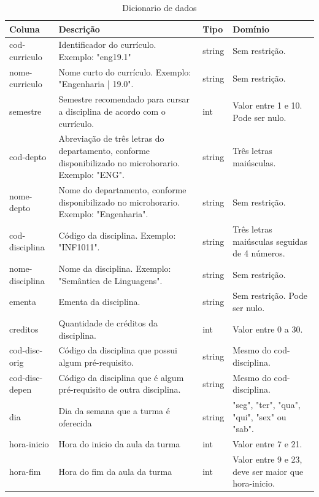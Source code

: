 \begin{longtable}{ | >{\raggedright}m{} | >{\raggedright}m{} | >{\raggedright}m{} | >{\raggedright}m{} | }
    \hline\endhead
    \hline\caption{Dicionario de dados}\endlastfoot

    \textbf{Coluna} & \textbf{Descrição} & \textbf{Tipo} & \textbf{Domínio}\tabularnewline\hline
     
    cod-curriculo & Identificador do currículo. Exemplo: "eng19.1" & string & Sem restrição.\tabularnewline\hline
    nome-curriculo & Nome curto do currículo. Exemplo: "Engenharia | 19.0". & string & Sem restrição.\tabularnewline\hline
    semestre & Semestre recomendado para cursar a disciplina de acordo com o currículo. & int & Valor entre 1 e 10. Pode ser nulo.\tabularnewline\hline

    cod-depto & Abreviação de três letras do departamento, conforme disponibilizado no microhorario. Exemplo: "ENG". & string & Três letras maiúsculas.\tabularnewline\hline
    nome-depto & Nome do departamento, conforme disponibilizado no microhorario. Exemplo: "Engenharia". & string & Sem restrição.\tabularnewline\hline

    cod-disciplina & Código da disciplina. Exemplo: "INF1011". & string & Três letras maiúsculas seguidas de 4 números.\tabularnewline\hline
    nome-disciplina & Nome da disciplina. Exemplo: "Semântica de Linguagens". & string & Sem restrição.\tabularnewline\hline
    ementa & Ementa da disciplina. & string & Sem restrição. Pode ser nulo.\tabularnewline\hline
    creditos & Quantidade de créditos da disciplina. & int & Valor entre 0 a 30.\tabularnewline\hline

    cod-disc-orig & Código da disciplina que possui algum pré-requisito. & string & Mesmo do cod-disciplina.\tabularnewline\hline
    cod-disc-depen & Código da disciplina que é algum pré-requisito de outra disciplina. & string & Mesmo do cod-disciplina.\tabularnewline\hline

    dia & Dia da semana que a turma é oferecida & string & "seg", "ter", "qua", "qui", "sex" ou "sab".\tabularnewline\hline
    hora-inicio & Hora do inicio da aula da turma & int & Valor entre 7 e 21.\tabularnewline\hline
    hora-fim & Hora do fim da aula da turma & int & Valor entre 9 e 23, deve ser maior que hora-inicio.\tabularnewline\hline
    

\end{longtable}
